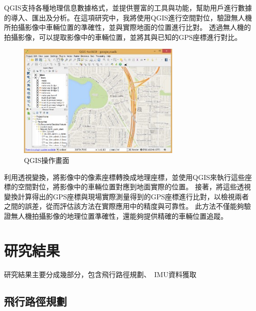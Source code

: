 \documentclass[12pt]{article}       %
\begin{document}
QGIS支持各種地理信息數據格式，並提供豐富的工具與功能，幫助用戶進行數據的導入、匯出及分析。在這項研究中，我將使用QGIS進行空間對位，驗證無人機所拍攝影像中車輛位置的準確性，並與實際地面的位置進行比對。
透過無人機的拍攝影像，可以提取影像中的車輛位置，並將其與已知的GPS座標進行對比。
\begin{figure}[H]
    \centering
    \includegraphics[width=0.7\textwidth]{qgis.jpg}     %
    \caption{QGIS操作畫面\cite{qgis_2020}}    %
    \label{fig:qgis}    %
\end{figure}
利用透視變換，將影像中的像素座標轉換成地理座標，並使用QGIS來執行這些座標的空間對位，將影像中的車輛位置對應到地面實際的位置。
接著，將這些透視變換計算得出的GPS座標與現場實際測量得到的GPS座標進行比對，以檢視兩者之間的誤差，從而評估該方法在實際應用中的精度與可靠性。
此方法不僅能夠驗證無人機拍攝影像的地理位置準確性，還能夠提供精確的車輛位置追蹤。


\section{\centering 研究結果}
\hspace{2em}研究結果主要分成幾部分，包含飛行路徑規劃、\
IMU資料獲取


\subsection{飛行路徑規劃}
\hspace{2em}
\end{document}
